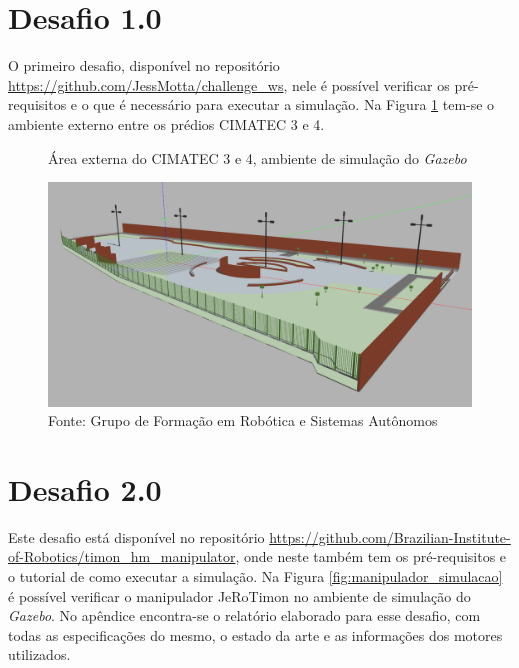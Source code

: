 \section{Desafio 1.0 }
\label{sec:desafio_1}
O primeiro desafio, disponível no repositório \url{https://github.com/JessMotta/challenge_ws}, nele é possível verificar os pré-requisitos e o que é necessário para executar a simulação. Na Figura \ref{fig:cimatec3_4} tem-se o ambiente externo entre os prédios CIMATEC 3 e 4.   


\begin{figure}[H]
    \caption{Área externa do CIMATEC 3 e 4, ambiente de simulação do \textit{Gazebo}}
    \centering
    \includegraphics[width= \textwidth]{Figures/cimatec4.png}
    \caption*{Fonte: Grupo de Formação em Robótica e Sistemas Autônomos}
    \label{fig:cimatec3_4}
\end{figure}



\section{Desafio 2.0 }
\label{sec:desafio_2}
Este desafio está disponível no repositório \url{https://github.com/Brazilian-Institute-of-Robotics/timon\_hm\_manipulator}, onde neste também tem os pré-requisitos e o tutorial de como executar a simulação. Na Figura \ref{fig:manipulador_simulacao} é possível verificar o manipulador JeRoTimon no ambiente de simulação do \textit{Gazebo}. No apêndice encontra-se o relatório elaborado para esse desafio, com todas as especificações do mesmo, o estado da arte e as informações dos motores utilizados.

